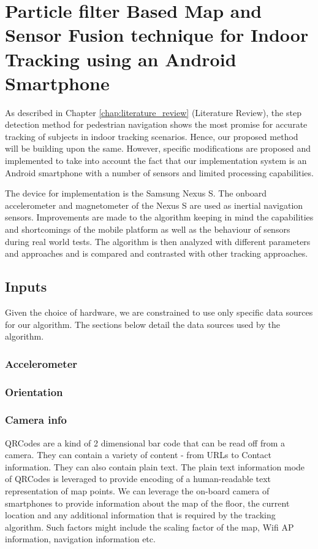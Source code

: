 \chapter[Proposed Work]{Particle filter Based Map and Sensor Fusion technique for Indoor Tracking 
using an Android Smartphone \label{chap:proposed_method}}

As described in Chapter \ref{chap:literature_review} (Literature Review),
the step detection method for pedestrian navigation shows the most promise
for accurate tracking of subjects in indoor tracking scenarios. 
Hence, our proposed method will be building upon the same. However, specific
modifications are proposed and implemented to take into account the fact 
that our implementation system is an Android smartphone with a number of 
sensors and limited processing capabilities. 

The device for implementation is the Samsung Nexus S. The onboard accelerometer 
and magnetometer of the Nexus S are used as inertial navigation sensors.
Improvements are made to the algorithm keeping in mind the capabilities and
shortcomings of the mobile platform as well as the behaviour of sensors during
real world tests. The algorithm is then analyzed with
different parameters and approaches and is compared and contrasted with other
tracking approaches.

\section{Inputs}

Given the choice of hardware, we are constrained to use only specific 
data sources for our algorithm. The sections below detail the data 
sources used by the algorithm.

\subsection{Accelerometer}


\subsection{Orientation}


\subsection{Camera info\label{sec:QRCodes}}
QRCodes are a kind of 2 dimensional bar code
that can be read off from a camera. They can contain a variety of content - 
from URLs to Contact information. They can also contain plain text. The 
plain text information mode of QRCodes is leveraged to provide encoding 
of a human-readable text representation of map points. We can leverage 
the on-board camera of smartphones to provide information about the map 
of the floor, the current location and any additional information that is 
required by the tracking algorithm. Such factors might include the scaling 
factor of the map, Wifi AP information, navigation information etc.

